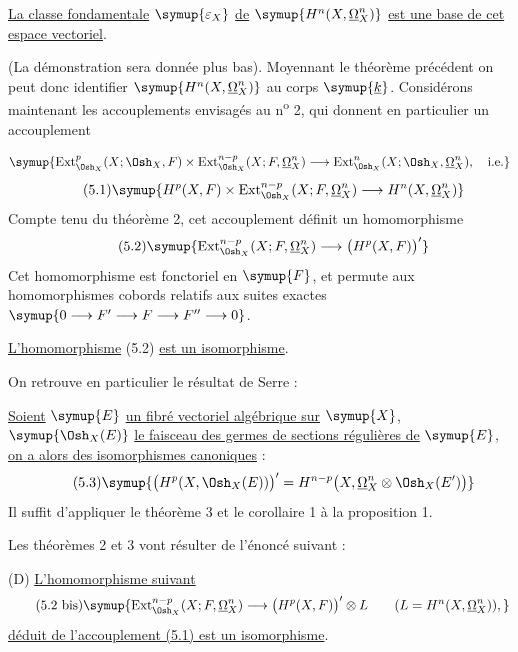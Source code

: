  \uline{La classe fondamentale} $\symup{\varepsilon_X}$ \uline{de}
$\symup{H^{n}(X,\underline{\Omega}_X^{n})}$ \uline{est une base de cet espace vectoriel}.

(La démonstration sera donnée plus bas). Moyennant le théorème précédent on peut
donc identifier $\symup{H^{n}(X,\underline{\Omega}_X^{n})}$ au corps $\symup{\underline{k}}$. Considérons maintenant les
accouplements envisagés au n\textsuperscript{o} 2, qui donnent en particulier un
accouplement

\[
\symup{\operatorname{Ext}_{\Osh_X}^{p}(X;\Osh_X,F)
\times\operatorname{Ext}_{\Osh_X}^{n-p}(X;F,\underline{\Omega}_X^{n})
\longrightarrow
\operatorname{Ext}_{\Osh_X}^{n}(X;\Osh_X,\underline{\Omega}_X^{n}),\quad\text{i.e.}}
\]
\begin{equation}\tag{5.1}
  \symup{H^{p}(X,F)
  \times\operatorname{Ext}_{\Osh_X}^{n-p}(X;F,\underline{\Omega}_X^{n})
  \longrightarrow H^{n}(X,\underline{\Omega}_X^{n})}
\end{equation}
Compte tenu du théorème 2, cet accouplement définit un homomorphisme
\begin{equation}\tag{5.2}
  \symup{\operatorname{Ext}_{\Osh_X}^{n-p}(X;F,\underline{\Omega}_X^{n})
  \longrightarrow\bigl(H^{p}(X,F)\bigr)'}
\end{equation}
Cet homomorphisme est fonctoriel en $\symup{F}$, et permute aux homomorphismes cobords
relatifs aux suites exactes $\symup{0\longrightarrow F'\longrightarrow F
\longrightarrow F''\longrightarrow0}$.

 \uline{L'homomorphisme} (5.2) \uline{est un isomorphisme}.

On retrouve en particulier le résultat de Serre :

 \uline{Soient} $\symup{E}$ \uline{un fibré vectoriel algébrique sur} $\symup{X}$,
$\symup{\Osh_X(E)}$ \uline{le faisceau des germes de sections régulières de} $\symup{E}$, \uline{on a alors des
isomorphismes canoniques} :
\begin{equation}\tag{5.3}
  \symup{\bigl(H^{p}(X,\Osh_X(E))\bigr)'
  =H^{n-p}\bigl(X,\underline{\Omega}_X^{n}\otimes\Osh_X(E')\bigr)}
\end{equation}
Il suffit d'appliquer le théorème 3 et le corollaire 1 à la proposition 1.

Les théorèmes 2 et 3 vont résulter de l'énoncé suivant :

\noindent(D) \uline{L'homomorphisme suivant}
\begin{equation}\tag{5.2 bis}
  \symup{\operatorname{Ext}_{\Osh_X}^{n-p}(X;F,\underline{\Omega}_X^{n})
  \longrightarrow\bigl(H^{p}(X,F)\bigr)'\otimes L
  \qquad (L=H^{n}(X,\underline{\Omega}_X^{n})),}
\end{equation}
\uline{déduit de l'accouplement (5.1) est un isomorphisme}.

